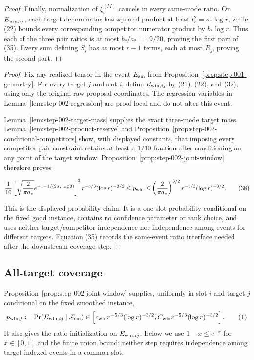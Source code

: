 \begin{proposition}
\begin{proof}
Finally, normalization of $\xi_i^{(M)}$ cancels in every same-mode ratio.
On $E_{{\rm win},ij}$, each target denominator has squared product at least
$t_r^2=a_*\log r$, while (22) bounds every corresponding competitor
numerator product by $b_*\log r$. Thus each of the three pair ratios is at
most $b_*/a_*=19/20$, proving the first part of (35). Every sum defining
$S_j$ has at most $r-1$ terms, each at most $R_j$, proving the second part.


\end{proof}
\end{proposition}
\begin{proof}
Fix any realized tensor in the event $E_{\rm sm}$ from Proposition~\ref{prop:step-001-geometry}.
For every target $j$ and slot $i$, define $E_{{\rm win},ij}$ by (21),
(22), and (32), using only the original raw proposal coordinates. The
regression variables in Lemma~\ref{lem:step-002-regression} are proof-local
and do not alter this event.

Lemma~\ref{lem:step-002-target-mass} supplies the exact three-mode target
mass. Lemma~\ref{lem:step-002-product-reserve} and
Proposition~\ref{prop:step-002-conditional-competitors} show, with displayed
constants, that imposing every competitor pair constraint retains at least a
$1/10$ fraction after conditioning on any point of the target window.
Proposition~\ref{prop:step-002-joint-window} therefore proves

\[
{1\over10}\left[\sqrt{2\over\pi a_*}
e^{-1-1/(2a_*\log3)}\right]^3
r^{-5/3}(\log r)^{-3/2}
\le p_{\rm win}
\le
\left({2\over\pi a_*}\right)^{3/2}
r^{-5/3}(\log r)^{-3/2}.
\tag{38}
\]

This is the displayed probability claim. It is a one-slot probability
conditional on the fixed good instance, contains no confidence parameter or
rank choice, and uses neither target/competitor independence nor independence
among events for different targets. Equation (35) records the same-event
ratio interface needed after the downstream coverage step.
\end{proof}

\subsection{All-target coverage}\label{app:step-003}

Proposition~\ref{prop:step-002-joint-window} supplies, uniformly in slot
$i$ and target $j$ conditional on the fixed smoothed instance,
\[
p_{{\rm win},j}:=
\Pr(E_{{\rm win},ij}\mid\mathcal F_{\rm sm})
\in\left[c_{\rm win}r^{-5/3}(\log r)^{-3/2},
C_{\rm win}r^{-5/3}(\log r)^{-3/2}\right].
\tag{1}
\]
It also gives the ratio initialization on $E_{{\rm win},ij}$. Below we use
$1-x\le e^{-x}$ for $x\in[0,1]$ and the finite union bound; neither step
requires independence among target-indexed events in a common slot.

